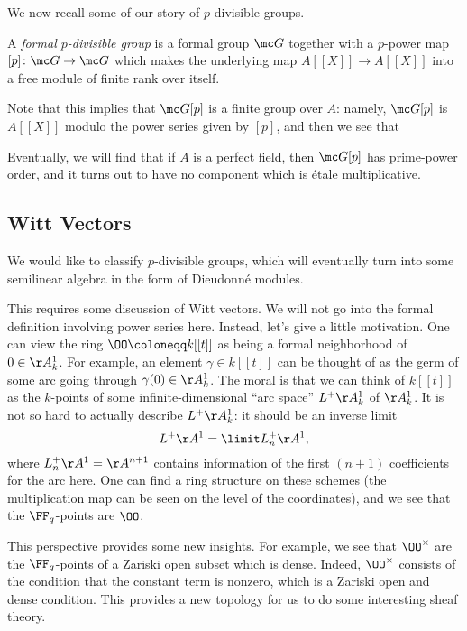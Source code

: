 \documentclass[../notes.tex]{subfiles}
\begin{document}
We now recall some of our story of $p$-divisible groups.
\begin{definition}
	A \textit{formal $p$-divisible group} is a formal group $\mc G$ together with a $p$-power map $[p]\colon\mc G\to\mc G$ which makes the underlying map $A[[X]]\to A[[X]]$ into a free module of finite rank over itself.
\end{definition}
\begin{remark}
	Note that this implies that $\mc G[p]$ is a finite group over $A$: namely, $\mc G[p]$ is $A[[X]]$ modulo the power series given by $[p]$, and then we see that
\end{remark}
\begin{remark}
	Eventually, we will find that if $A$ is a perfect field, then $\mc G[p]$ has prime-power order, and it turns out to have no component which is \'etale multiplicative.
\end{remark}

\subsection{Witt Vectors}
We would like to classify $p$-divisible groups, which will eventually turn into some semilinear algebra in the form of Dieudonn\'e modules.

This requires some discussion of Witt vectors. We will not go into the formal definition involving power series here. Instead, let's give a little motivation. One can view the ring $\OO\coloneqq k[[t]]$ as being a formal neighborhood of $0\in\AA^1_{k}$. For example, an element $\gamma\in k[[t]]$ can be thought of as the germ of some arc going through $\gamma(0)\in\AA^1_{k}$. The moral is that we can think of $k[[t]]$ as the $k$-points of some infinite-dimensional ``arc space'' $L^+\AA^1_k$ of $\AA^1_{k}$. It is not so hard to actually describe $L^+\AA^1_k$: it should be an inverse limit
\[L^+\AA^1=\limit L_n^+\AA^1,\]
where $L_n^+\AA^1=\AA^{n+1}$ contains information of the first $(n+1)$ coefficients for the arc here. One can find a ring structure on these schemes (the multiplication map can be seen on the level of the coordinates), and we see that the $\FF_q$-points are $\OO$.

This perspective provides some new insights. For example, we see that $\OO^\times$ are the $\FF_q$-points of a Zariski open subset which is dense. Indeed, $\OO^\times$ consists of the condition that the constant term is nonzero, which is a Zariski open and dense condition. This provides a new topology for us to do some interesting sheaf theory.
\end{document}
